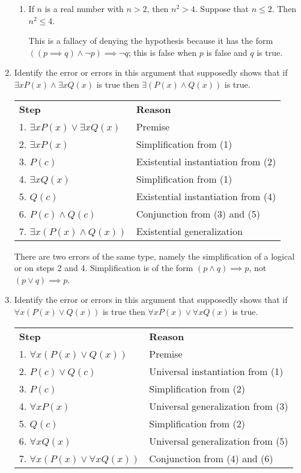 \documentclass[11pt]{article}
\begin{document}
\begin{enumerate}[label=\textbf{\arabic*.}]
\begin{enumerate}[label=\textbf{\alph*)}]
		\item If $n$ is a real number with $n > 2$, then $n^2 > 4$. Suppose that $n \leq 2$. Then $n^2 \leq 4$.
		
		This is a fallacy of denying the hypothesis because it has the form $((p \implies q) \land \neg p) \implies \neg q$; this is false when $p$ is false and $q$ is true.
	\end{enumerate}

	\pagebreak
	\item Identify the error or errors in this argument that supposedly shows that if $\exists xP(x) \land \exists xQ(x)$ is true then $\exists(P(x) \land Q(x))$ is true.
	
	\begin{center}
	\begin{tabular}{ll}
		\textbf{Step} & \textbf{Reason} \\
		1. $\exists xP(x) \lor \exists xQ(x)$ & Premise \\
		2. $\exists xP(x)$ & Simplification from (1) \\
		3. $P(c)$ & Existential instantiation from (2) \\
		4. $\exists xQ(x)$ & Simplification from (1) \\
		5. $Q(c)$ & Existential instantiation from (4) \\
		6. $P(c) \land Q(c)$ & Conjunction from (3) and (5) \\
		7. $\exists x(P(x) \land Q(x))$ & Existential generalization
	\end{tabular}
	\end{center}

	There are two errors of the same type, namely the simplification of a logical or on steps 2 and 4. Simplification is of the form $(p \land q) \implies p$, not $(p \lor q) \implies p$.
	
	\item Identify the error or errors in this argument that supposedly shows that if $\forall x(P(x) \lor Q(x))$ is true then $\forall xP(x) \lor \forall xQ(x)$ is true.
	
	\begin{center}
	\begin{tabular}{ll}
		\textbf{Step} & \textbf{Reason} \\
		1. $\forall x(P(x) \lor Q(x))$ & Premise \\
		2. $P(c) \lor Q(c)$ & Universal instantiation from (1) \\
		3. $P(c)$ & Simplification from (2) \\
		4. $\forall xP(x)$ & Universal generalization from (3) \\
		5. $Q(c)$ & Simplification from (2) \\
		6. $\forall xQ(x)$ & Universal generalization from (5) \\
		7. $\forall x(P(x) \lor \forall xQ(x))$ & Conjunction from (4) and (6)
	\end{tabular}
	\end{center}


\end{enumerate}
\end{document}
